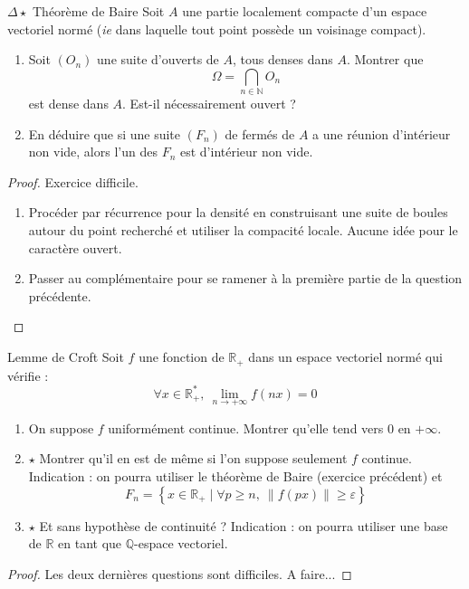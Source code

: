 \documentclass[french,a4paper]{article}
\newcommand{\N}{\mathbb{N}}
\newcommand{\Q}{\mathbb{Q}}
\newcommand{\R}{\mathbb{R}}
\newcommand{\st}{^*}
\theoremstyle{plain}
\theoremstyle{definition}
\theoremstyle{remark}
\begin{document}
\begin{ex}[Moulin.12]{$\Delta\star$ Théorème de Baire}
	Soit $A$ une partie localement compacte d'un espace vectoriel normé (\textit{ie} dans laquelle tout point possède un voisinage compact).
	\begin{enumerate}
		\item Soit $(O_n)$ une suite d'ouverts de $A$, tous denses dans $A$. Montrer que $$\Omega=\bigcap_{n\in\N} O_n$$ est dense dans $A$. Est-il nécessairement ouvert ?
		\item En déduire que si une suite $(F_n)$ de fermés de $A$ a une réunion d'intérieur non vide, alors l'un des $F_n$ est d'intérieur non vide.
	\end{enumerate}
\end{ex}
\begin{proof}
	Exercice difficile.
	\begin{enumerate}
		\item Procéder par récurrence pour la densité en construisant une suite de boules autour du point recherché et utiliser la compacité locale. Aucune idée pour le caractère ouvert.
		\item Passer au complémentaire pour se ramener à la première partie de la question précédente.
	\end{enumerate}
\end{proof}

\begin{ex}[Moulin.13]{Lemme de Croft}
	Soit $f$ une fonction de $\R_+$ dans un espace vectoriel normé qui vérifie : $$\forall x\in\R_+\st,\ \lim_{n\to+\infty}f(nx)=0$$
	\begin{enumerate}
		\item On suppose $f$ uniformément continue. Montrer qu'elle tend vers $0$ en $+\infty$.
		\item $\star$ Montrer qu'il en est de même si l'on suppose seulement $f$ continue. Indication : on pourra utiliser le théorème de Baire (exercice précédent) et $$F_n=\left\{x\in\R_+\mid \forall p\geqslant n,\ \lVert f(px)\rVert\geqslant\varepsilon\right\}$$
		\item $\star$ Et sans hypothèse de continuité ? Indication : on pourra utiliser une base de $\R$ en tant que $\Q$-espace vectoriel. 
	\end{enumerate}
\end{ex}
\begin{proof}
	Les deux dernières questions sont difficiles. A faire...
\end{proof}
\end{document}
